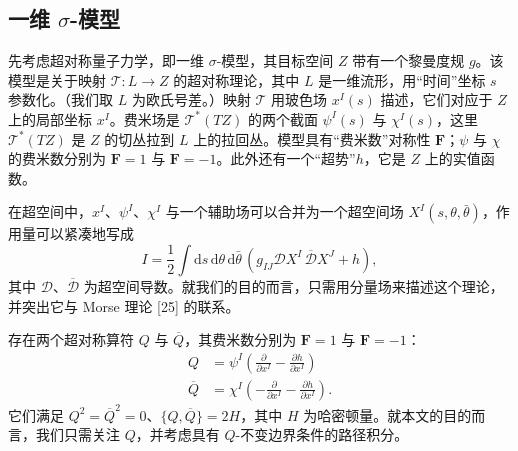 \documentclass[11pt,a4paper,UTF8]{ctexart}
\theoremstyle{plain}
\theoremstyle{definition}
\newcommand{\sigmatxt}{$\sigma$}
\begin{document}
\subsection{一维 \sigmatxt-模型}

先考虑超对称量子力学，即一维 $\sigma$-模型，其目标空间 $Z$ 带有一个黎曼度规 $g$。该模型是关于映射 $\mathcal{T}:L\to Z$ 的超对称理论，其中 $L$ 是一维流形，用“时间”坐标 $s$ 参数化。（我们取 $L$ 为欧氏号差。）映射 $\mathcal{T}$ 用玻色场 $x^I(s)$ 描述，它们对应于 $Z$ 上的局部坐标 $x^I$。费米场是 $\mathcal{T}^*(TZ)$ 的两个截面 $\psi^I(s)$ 与 $\chi^I(s)$，这里 $\mathcal{T}^*(TZ)$ 是 $Z$ 的切丛拉到 $L$ 上的拉回丛。模型具有“费米数”对称性 $\boldsymbol{F}$；$\psi$ 与 $\chi$ 的费米数分别为 $\boldsymbol{F}=1$ 与 $\boldsymbol{F}=-1$。此外还有一个“超势”$h$，它是 $Z$ 上的实值函数。

在超空间中，$x^I$、$\psi^I$、$\chi^I$ 与一个辅助场可以合并为一个超空间场 $X^I(s,\theta,\bar\theta)$，作用量可以紧凑地写成
\begin{equation}
    I=\frac{1}{2}\int \mathrm{d}s\,\mathrm{d}\theta\,\mathrm{d}\bar\theta\,
    \left(g_{IJ}\mathcal{D}X^I\,\overline{\mathcal{D}}X^J+h\right),
    \tag{4.1}
\end{equation}
其中 $\mathcal{D}$、$\overline{\mathcal{D}}$ 为超空间导数。就我们的目的而言，只需用分量场来描述这个理论，并突出它与 Morse 理论 [25] 的联系。


存在两个超对称算符 $Q$ 与 $\overline{Q}$，其费米数分别为 $\boldsymbol{F}=1$ 与 $\boldsymbol{F}=-1$：
\begin{align}
    Q &= \psi^I\left(\frac{\partial}{\partial x^I}-\frac{\partial h}{\partial x^I}\right)\nonumber\\
    \overline{Q} &= \chi^I\left(-\frac{\partial}{\partial x^I}-\frac{\partial h}{\partial x^I}\right).
    \tag{4.2}
\end{align}
它们满足 $Q^2=\overline{Q}^2=0$、$\{Q,\overline{Q}\}=2H$，其中 $H$ 为哈密顿量。就本文的目的而言，我们只需关注 $Q$，并考虑具有 $Q$-不变边界条件的路径积分。
\end{document}
